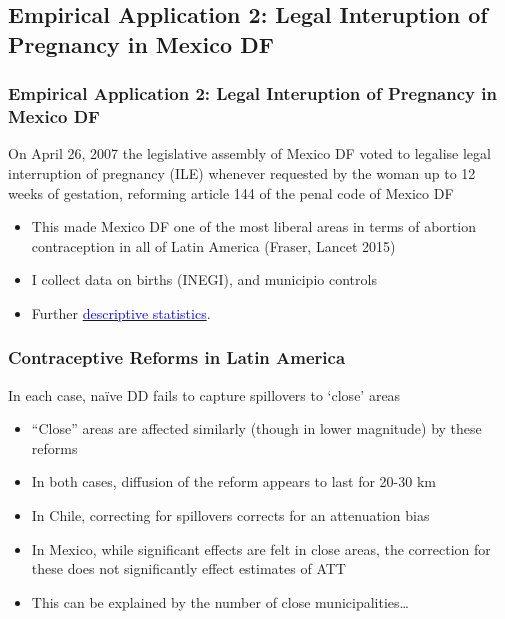 \documentclass[10pt,letterpaper,subeqn]{beamer}
\begin{document}
\subsection{Empirical Application 2: Legal Interuption of Pregnancy in Mexico DF}
\begin{frame}[label=empirB]
  \frametitle{Empirical Application 2: Legal Interuption of Pregnancy in Mexico DF}
On April 26, 2007 the legislative assembly of Mexico DF voted to legalise legal 
interruption of pregnancy (ILE) whenever requested by the woman up to 12 weeks of 
gestation, reforming article 144 of the penal code of Mexico DF
\vspace{5mm}
\begin{itemize}
\item This made Mexico DF one of the most liberal areas in terms of abortion
contraception in all of Latin America (Fraser, Lancet 2015)
\item I collect data on births (INEGI), and municipio controls
\item Further \hyperlink{MexicoDesc}{\textcolor{blue}{descriptive statistics}}.
\end{itemize}

\end{frame}

\begin{frame}[label=empirB2]

\end{frame}

\begin{frame}[label=empirB3]
 \frametitle{Contraceptive Reforms in Latin America}
In each case, na\"ive DD fails to capture spillovers to `close' areas
\vspace{8mm}
\begin{itemize}
\item ``Close'' areas are affected similarly (though in lower magnitude) by these reforms
\item In both cases, diffusion of the reform appears to last for 20-30 km
\item In Chile, correcting for spillovers corrects for an attenuation bias
\item In Mexico, while significant effects are felt in close areas, the correction for
these does not significantly effect estimates of ATT
\item This can be explained by the number of close municipalities\ldots
\end{itemize}
\end{frame}
\end{document}
